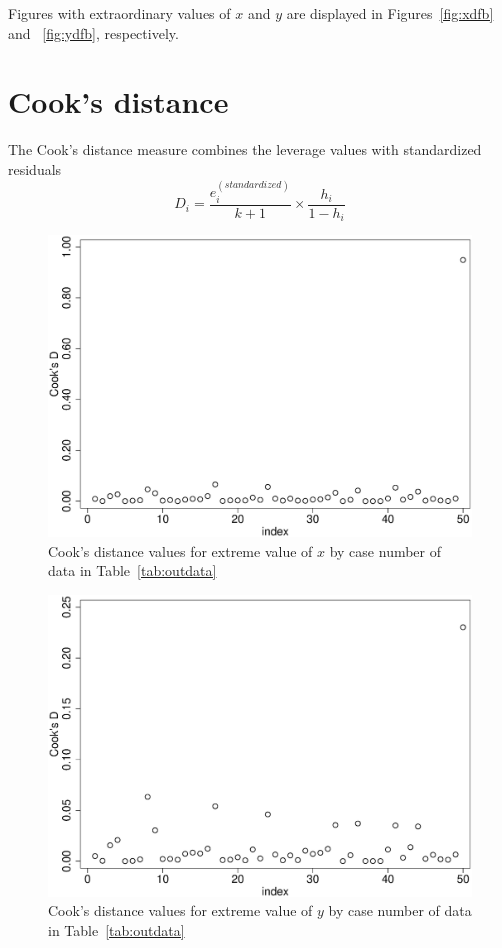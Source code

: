 Figures with extraordinary values of $x$ and $y$ are displayed in Figures~\ref{fig:xdfb} and ~\ref{fig:ydfb}, respectively.

\section{Cook's distance}

The Cook's distance measure combines the leverage values with standardized residuals
\begin{equation}
D_i = \frac{e^{\left(standardized\right)}_i}{k+1}\times\frac{h_i}{1-h_i}
\end{equation}


\begin{figure}
   \centering
   \includegraphics[angle=0,
           width=.75\textwidth]{xout_cooks_index.eps}
   \caption{Cook's distance values for extreme value of $x$ by case number of data in Table~\ref{tab:outdata}}
  \label{fig:xcook}
\end{figure}

\begin{figure}
   \centering
   \includegraphics[angle=0,
           width=.75\textwidth]{yout_cooks_index.eps}
   \caption{Cook's distance values for extreme value of $y$ by case number of data in Table~\ref{tab:outdata}}
  \label{fig:ycook}
\end{figure}

